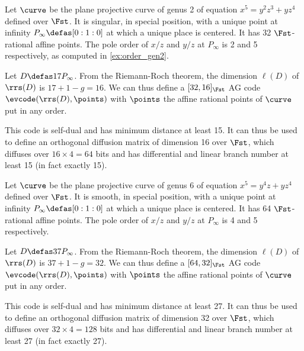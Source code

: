 \begin{example}
\label{ex:genus2}
Let $\curve$ be the plane projective curve of genus 2 of equation $x^5 = y^2z^3 + yz^4$ defined over $\Fst$. It is singular, in special position,
with a unique point at infinity $P_\infty \defas [0:1:0]$ at which a unique place is centered. It has 32 $\Fst$-rational affine points. The pole order
of $x/z$ and $y/z$ at $P_\infty$ is 2 and 5 respectively, as computed in \autoref{ex:order_gen2}.

Let $D \defas 17P_\infty$. From the Riemann-Roch theorem, the dimension $\ell(D)$ of $\rrs(D)$ is $17 + 1 - g = 16$. We can thus
define a $[32, 16]_{\Fst}$ AG code $\evcode(\rrs(D), \points)$ with $\points$ the affine rational points of $\curve$
put in any order.

This code is self-dual and has minimum distance at least 15.
It can thus be used to define an orthogonal diffusion matrix of dimension 16 over $\Fst$, which diffuses over $16\times 4 = 64$ bits and
has differential and linear branch number at least 15 (in fact exactly 15).
\end{example}

\begin{example}
\label{ex:genus6}
Let $\curve$ be the plane projective curve of genus 6 of equation $x^5 = y^4z + yz^4$ defined over $\Fst$. It is smooth, in special position,
with a unique point at infinity $P_\infty \defas [0:1:0]$ at which a unique place is centered. It has 64 $\Fst$-rational affine points. The pole order
of $x/z$ and $y/z$ at $P_\infty$ is 4 and 5 respectively.

Let $D \defas 37P_\infty$. From the Riemann-Roch theorem, the dimension $\ell(D)$ of $\rrs(D)$ is $37 + 1 - g = 32$. We can thus
define a $[64, 32]_{\Fst}$ AG code $\evcode(\rrs(D), \points)$ with $\points$ the affine rational points of $\curve$
put in any order.

This code is self-dual and has minimum distance at least 27.
It can thus be used to define an orthogonal diffusion matrix of dimension 32 over $\Fst$, which diffuses over $32\times 4 = 128$ bits and
has differential and linear branch number at least 27 (in fact exactly 27).
\end{example}
